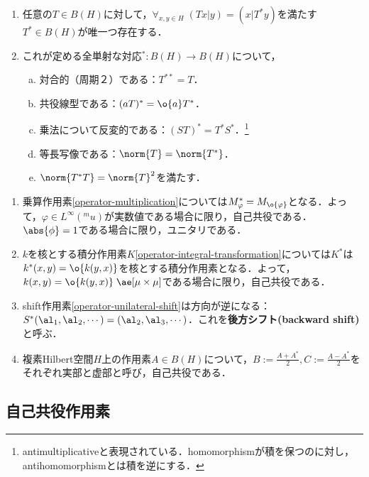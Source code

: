 \documentclass[uplatex,dvipdfmx]{jsreport}
\begin{document}
\begin{theorem}[随伴作用素の定義と性質]\mbox{}\label{thm-existence-of-adjoint-operator}
    \begin{enumerate}
        \item 任意の$T\in B(H)$に対して，$\forall_{x,y\in H}\;(Tx|y)=(x|T^*y)$を満たす$T^*\in B(H)$が唯一つ存在する．
        \item これが定める全単射な対応${}^*:B(H)\to B(H)$について，
        \begin{enumerate}[(a)]
            \item 対合的（周期２）である：$T^{**}=T$．
            \item 共役線型である：$(aT)^*=\o{a}T^*$．
            \item 乗法について反変的である：$(ST)^*=T^*S^*$．\footnote{antimultiplicativeと表現されている．homomorphismが積を保つのに対し，antihomomorphismとは積を逆にする．}
            \item 等長写像である：$\norm{T}=\norm{T^*}$．
            \item $\norm{T^*T}=\norm{T}^2$を満たす．
        \end{enumerate}
    \end{enumerate}
\end{theorem}

\begin{example}[随伴]\mbox{}
    \begin{enumerate}
        \item 乗算作用素\ref{operator-multiplication}については$M^*_\varphi=M_{\o{\varphi}}$となる．よって，$\varphi\in L^\infty(^mu)$が実数値である場合に限り，自己共役である．$\abs{\phi}=1$である場合に限り，ユニタリである．
        \item $k$を核とする積分作用素$K$\ref{operator-integral-transformation}については$K^*$は$k^*(x,y)=\o{k(y,x)}$を核とする積分作用素となる．よって，$k(x,y)=\o{k(y,x)}\;\ae[\mu\times\mu]$である場合に限り，自己共役である．
        \item shift作用素\ref{operator-unilateral-shift}は方向が逆になる：$S^*(\al_1,\al_2,\cdots)=(\al_2,\al_3,\cdots)$．これを\textbf{後方シフト(backward shift)}と呼ぶ．
        \item 複素Hilbert空間$H$上の作用素$A\in B(H)$について，$B:=\frac{A+A^*}{2},C:=\frac{A-A^*}{2}$をそれぞれ実部と虚部と呼び，自己共役である．
    \end{enumerate}
\end{example}

\subsection{自己共役作用素}
\end{document}

